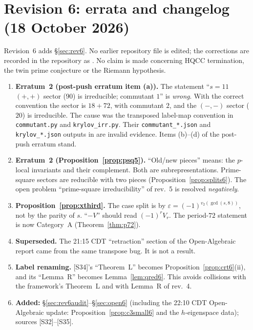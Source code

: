 \section{Revision 6: errata and changelog (18 October 2026)}\label{app:rev6}
Revision~6 adds \S\ref{sec:rev6}. No earlier repository file is edited; the corrections are recorded in the repository as . No claim is made concerning HQCC termination, the twin prime conjecture or the Riemann hypothesis.
\begin{enumerate}[label={R6.\arabic*},leftmargin=3em]
\item \textbf{Erratum~2 (post-push erratum item (a)).} The statement ``$s=11$ $(+,+)$ sector ($90$) is irreducible; commutant $1$'' is \emph{wrong}. With the correct convention the sector is $18+72$, with commutant $2$, and the $(-,-)$ sector ($20$) is irreducible. The cause was the transposed label-map convention in \texttt{commutant.py} and \texttt{krylov\_irr.py}. Their \texttt{commutant\_*.json} and \texttt{krylov\_*.json} outputs in  are invalid evidence. Items (b)--(d) of the post-push erratum stand.
\item \textbf{Erratum~2 (Proposition~\ref{prop:psq5}).} ``Old/new pieces'' means: the $p$-local invariants and their complement. Both are subrepresentations. Prime-square sectors are reducible with two pieces (Proposition~\ref{prop:splits6}). The open problem ``prime-square irreducibility'' of rev.~5 is resolved \emph{negatively}.
\item \textbf{Proposition~\ref{prop:xthird}.} The case split is by $\varepsilon=(-1)^{v_2(\gcd(s,8))}$, not by the parity of $s$. ``$-V$'' should read $(-1)^rV_r$. The period-$72$ statement is now Category~A (Theorem~\ref{thm:p72}).
\item \textbf{Superseded.} The 21:15 CDT ``retraction'' section of the Open-Algebraic report came from the same transpose bug. It is not a result.
\item \textbf{Label renaming.} [S34]'s ``Theorem~L'' becomes Proposition~\ref{prop:crt6}(ii), and its ``Lemma~R'' becomes Lemma~\ref{lem:qred6}. This avoids collisions with the framework's Theorem~L and with Lemma~R of rev.~4.
\item \textbf{Added:} \S\ref{sec:rev6audit}--\S\ref{sec:open6} (including the 22:10 CDT Open-Algebraic update: Proposition~\ref{prop:c3small6} and the $h$-eigenspace data); sources [S32]--[S35].
\end{enumerate}
